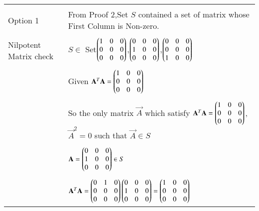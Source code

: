 \begin{longtable}{|l|l|}
	\hline
	\multirow{3}{*}{Option 1} & \\
	&From Proof 2,Set $S$ contained a set of matrix whose First Column is Non-zero. \\ 
    & \\
    Nilpotent Matrix check&$S\in$ Set$\begin{pmatrix}1&0&0\\0&0&0\\0&0&0\end{pmatrix}$,$\begin{pmatrix}0&0&0\\1&0&0\\0&0&0\end{pmatrix}$,$\begin{pmatrix}0&0&0\\0&0&0\\1&0&0\end{pmatrix}$\\
    &\\
    &Given $\mathbf{A}^T\mathbf{A}=\begin{pmatrix}1&0&0\\0&0&0\\0&0&0\end{pmatrix}$\\
    &\\
    &So the only matrix $\vec{A}$ which satisfy $\mathbf{A}^T\mathbf{A}=\begin{pmatrix}1&0&0\\0&0&0\\0&0&0\end{pmatrix}$, $\vec{A}^2=0$ such that $\vec{A}\in S$\\
    &\\
    &$\mathbf{A}=\begin{pmatrix}0&0&0\\1&0&0\\0&0&0\end{pmatrix}\in S$\\
    &\\
    &$\mathbf{A}^T\mathbf{A}=\begin{pmatrix}0&1&0\\0&0&0\\0&0&0\end{pmatrix}\begin{pmatrix}0&0&0\\1&0&0\\0&0&0\end{pmatrix}=\begin{pmatrix}1&0&0\\0&0&0\\0&0&0\end{pmatrix}$\\
    

\end{longtable}
